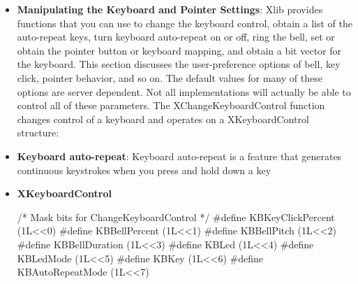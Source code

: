 \documentclass{report}
\begin{document}
\begin{itemize}
\begin{itemize}
            \end{itemize}
            The \textbf{XGetInputFocus} function returns the focus window and the current focus state.
        \item \textbf{Manipulating the Keyboard and Pointer Settings}: Xlib provides functions that you can use to change the keyboard control, obtain a list of the auto-repeat keys, turn keyboard auto-repeat on or off, ring the bell, set or obtain the pointer button or keyboard mapping, and obtain a bit vector for the keyboard.
            \bigbreak \noindent 
            This section discusses the user-preference options of bell, key click, pointer behavior, and so on. The default values for many of these options are server dependent. Not all implementations will actually be able to control all of these parameters.
            \bigbreak \noindent 
            The XChangeKeyboardControl function changes control of a keyboard and operates on a XKeyboardControl structure:
        \item \textbf{Keyboard auto-repeat}: Keyboard auto-repeat is a feature that generates continuous keystrokes when you press and hold down a key
        \item \textbf{XKeyboardControl}
            \bigbreak \noindent 
            \begin{cppcode}
            /* Mask bits for ChangeKeyboardControl */
            #define KBKeyClickPercent (1L<<0)
            #define KBBellPercent (1L<<1)
            #define KBBellPitch (1L<<2)
            #define KBBellDuration (1L<<3)
            #define KBLed (1L<<4)
            #define KBLedMode (1L<<5)
            #define KBKey (1L<<6)
            #define KBAutoRepeatMode (1L<<7)


\end{cppcode}
\end{itemize}
\end{document}
